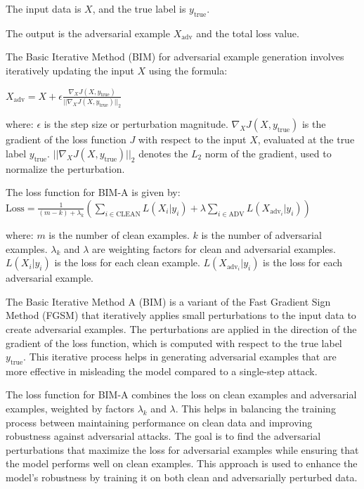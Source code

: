 The input data is $X$, and the true label is $y_{\text{true}}$.

The output is the adversarial example $X_{\text{adv}}$ and the total loss value.

The Basic Iterative Method (BIM) for adversarial example generation involves iteratively updating the input $X$ using the formula:

$X_{\text{adv}} = X + \epsilon \frac{\nabla_X J(X, y_{\text{true}})} {||\nabla_X J(X, y_{\text{true}})||_2}$

where:
$\epsilon$ is the step size or perturbation magnitude.
$\nabla_X J(X, y_{\text{true}})$ is the gradient of the loss function $J$ with respect to the input $X$, evaluated at the true label $y_{\text{true}}$.
$||\nabla_X J(X, y_{\text{true}})||_2$ denotes the $L_2$ norm of the gradient, used to normalize the perturbation.


The loss function for BIM-A is given by:
$\text{Loss} = \frac{1}{{(m - k)} + \lambda_k } \left( \sum_{i \in \text{CLEAN}} L(X_i | y_i) + \lambda \sum_{i \in \text{ADV}} L(X_{\text{adv}_i} | y_i) \right)$

where:
$m$ is the number of clean examples.
$k$ is the number of adversarial examples.
$\lambda_k$ and $\lambda$ are weighting factors for clean and adversarial examples.
$L(X_i | y_i)$ is the loss for each clean example.
$L(X_{\text{adv}_i} | y_i)$ is the loss for each adversarial example.


The Basic Iterative Method A (BIM) is a variant of the Fast Gradient Sign Method (FGSM) that iteratively applies small perturbations to the input data to create adversarial examples. The perturbations are applied in the direction of the gradient of the loss function, which is computed with respect to the true label $y_{\text{true}}$. This iterative process helps in generating adversarial examples that are more effective in misleading the model compared to a single-step attack.

The loss function for BIM-A combines the loss on clean examples and adversarial examples, weighted by factors $\lambda_k$ and $\lambda$. This helps in balancing the training process between maintaining performance on clean data and improving robustness against adversarial attacks. The goal is to find the adversarial perturbations that maximize the loss for adversarial examples while ensuring that the model performs well on clean examples. This approach is used to enhance the model's robustness by training it on both clean and adversarially perturbed data.